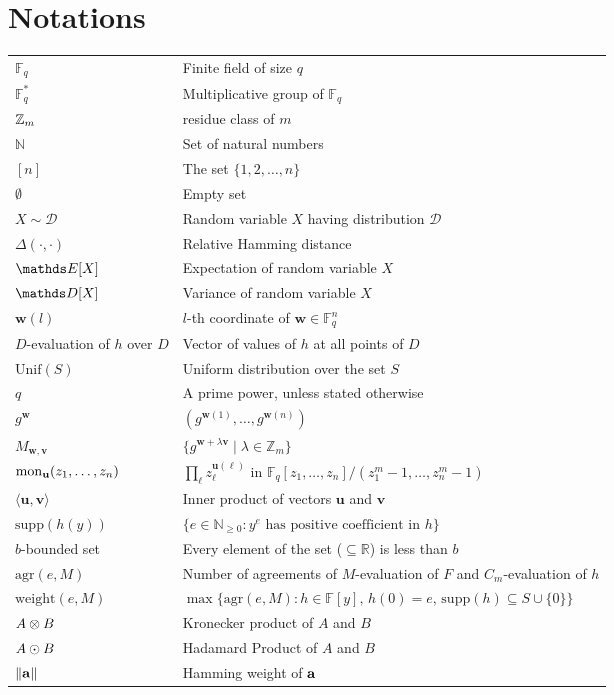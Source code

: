 \chapter*{Notations}

\begin{longtable}{@{} l p{9cm} @{}}
$\mathbb{F}_q$ & Finite field of size $q$ \\[0.4em]
$\mathbb{F}_q^*$ & Multiplicative group of $\mathbb{F}_q$ \\[0.4em]
$\mathbb{Z}_m$ & residue class of $m$ \\[0.4em]
$\mathbb{N}$ & Set of natural numbers \\[0.4em]
$[n]$ & The set $\{1,2,\dots,n\}$ \\[0.4em]
$\emptyset$ & Empty set \\[0.4em]
$X \sim \mathscr{D}$ & Random variable $X$ having distribution $\mathscr{D}$ \\[0.4em]
$\Delta(\cdot,\cdot)$ & Relative Hamming distance \\[0.4em]
$\E[X]$ & Expectation of random variable $X$ \\[0.4em]
$\D[X]$ & Variance of random variable $X$ \\[0.4em]
$\mathbf{w}(l)$ & $l$-th coordinate of $\mathbf{w}\in\mathbb{F}_q^n$ \\[0.4em]
$D$-evaluation of $h$ over $D$ & Vector of values of $h$ at all points of $D$ \\[0.4em]
$\mathrm{Unif}(S)$ & Uniform distribution over the set $S$ \\[0.4em]
$q$ & A prime power, unless stated otherwise \\[0.4em]
$g^{\mathbf{w}}$ & $(g^{\mathbf{w}(1)}, \ldots, g^{\mathbf{w}(n)})$ \\[0.4em]
$M_{\mathbf{w},\mathbf{v}}$ & $\{g^{\mathbf{w}+\lambda\mathbf{v}} \mid \lambda \in \mathbb{Z}_m\}$ \\[0.4em]
$\operatorname{mon}_{\mathbf{u}}(z_1,\ldots,z_n)$ & $\prod_{\ell} z_\ell^{\mathbf{u}(\ell)}$ in $\mathbb{F}_q[z_1,\dots,z_n]/(z_1^m-1,\dots,z_n^m-1)$ \\[0.4em]
$\langle\mathbf{u},\mathbf{v}\rangle$ & Inner product of vectors $\mathbf{u}$ and $\mathbf{v}$ \\[0.4em]
$\mathrm{supp}(h(y))$ & $\{e\in\mathbb{N}_{\geq0} : y^e\text{ has positive coefficient in }h\}$ \\[0.4em]
$b$-bounded set & Every element of the set ($\subseteq\mathbb{R}$) is less than $b$ \\[0.4em]
$\mathrm{agr}(e,M)$ & Number of agreements of $M$-evaluation of $F$ and $C_m$-evaluation of $h$ \\[0.4em]
$\mathrm{weight}(e,M)$ & $\max\{\mathrm{agr}(e,M) : h\in\mathbb{F}[y],\, h(0)=e,\, \mathrm{supp}(h)\subseteq S\cup\{0\}\}$ \\[0.4em]
$A \otimes B$ & Kronecker product of $A$ and $B$ \\[0.4em]
$A\odot B$ & Hadamard Product of $A$ and $B$ \\[0.4em]
$\|\mathbf{a}\|$ & Hamming weight of $\mathbf{a}$\\[0.4em]
\end{longtable}